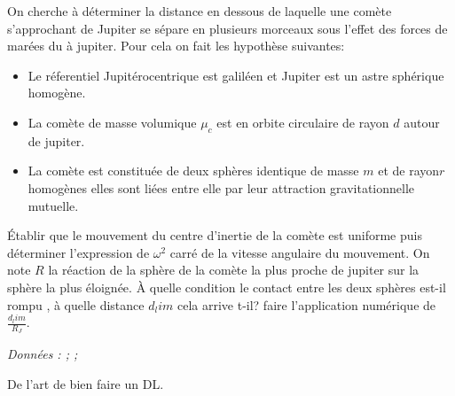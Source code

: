 \begin{Exercise}[title=(*) Limite de Roche]
On cherche à déterminer la distance en dessous de laquelle une comète s'approchant de Jupiter se sépare en plusieurs morceaux sous l'effet des forces de marées du à jupiter. Pour cela on fait les hypothèse suivantes:
\begin{itemize}
	\item Le réferentiel Jupitérocentrique est galiléen et Jupiter est un astre sphérique homogène.
	\item La comète de masse volumique $\mu_c$ est en orbite circulaire de rayon $d$ autour de jupiter.
	\item La comète est constituée de deux sphères identique de masse $m$ et de rayon$r$ homogènes elles sont liées entre elle par leur attraction gravitationnelle mutuelle.
\end{itemize}
\Question Établir que le mouvement du centre d'inertie de la comète est uniforme puis déterminer l'expression de $\omega^2$ carré de la vitesse angulaire du mouvement.
\Question On note $R$ la réaction de la sphère  de la comète la plus proche de jupiter sur la sphère la plus éloignée. À quelle condition le contact entre les deux sphères est-il rompu , à quelle distance $d_lim$ cela arrive t-il?
\Question faire l'application numérique de $\frac{d_lim}{R_J}$.

\emph{Données : ; ; }
\end{Exercise}
\begin{Answer}
De l'art de bien faire un DL.
\end{Answer}

